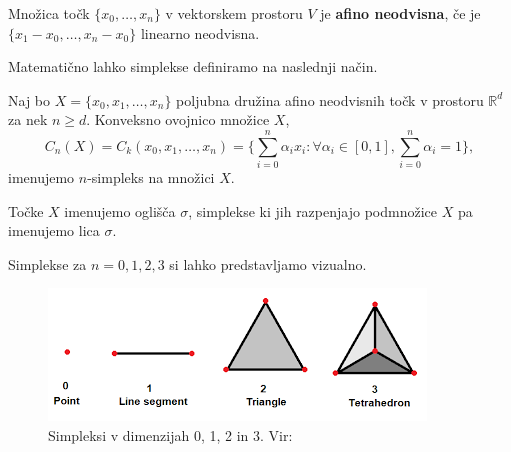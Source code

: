\begin{definicija}
    Množica točk $\{x_0, \dots, x_n\}$ v vektorskem prostoru $V$ je \textbf{afino neodvisna}, če je $\{x_1 - x_0, \dots, x_n - x_0\}$ linearno neodvisna.
\end{definicija}

Matematično lahko simplekse definiramo na naslednji način.

\begin{definicija}
Naj bo \(X = \{x_0, x_1, \dots, x_n\}\) poljubna družina afino neodvisnih točk v prostoru \(\mathbb{R}^d\) za nek \(n \geq d\). Konveksno ovojnico množice \(X\),
\[
C_n(X) = C_k(x_0, x_1, \dots, x_n) = \{\sum_{i=0}^n \alpha_i x_i : \forall \alpha_i \in [0, 1], \sum_{i=0}^n \alpha_i = 1\},
\]
imenujemo \(n\)-simpleks na množici \(X\).
\end{definicija}

Točke \(X\) imenujemo oglišča \(\sigma\), simplekse ki jih razpenjajo podmnožice \(X\) pa imenujemo lica \(\sigma\).

Simplekse za $n = 0, 1, 2, 3$ si lahko predstavljamo vizualno.

\begin{figure}[H]
    \centering
    \includegraphics{resources/simplex.png}
    \caption{Simpleksi v dimenzijah 0, 1, 2 in 3. Vir:~\cite{schneider_simplexes}}\label{fig:enter-label1}
\end{figure}

